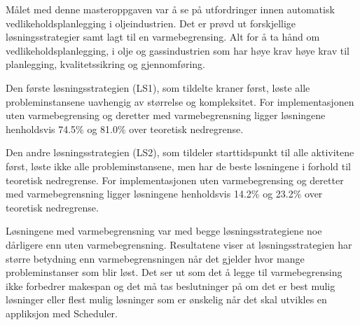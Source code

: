 Målet med denne masteroppgaven var å se på utfordringer innen automatisk vedlikeholdsplanlegging i oljeindustrien. Det er prøvd ut forskjellige løsningsstrategier samt lagt til en varmebegrensing. Alt for å ta hånd om vedlikeholdsplanlegging, i olje og gassindustrien som har høye krav høye krav til planlegging, kvalitetssikring og gjennomføring.

Den første løsningsstrategien (LS1), som tildelte kraner først, løste alle probleminstansene uavhengig av størrelse og kompleksitet. For implementasjonen uten varmebegrensing og deretter med varmebegrensning ligger løsningene henholdsvis 74.5\% og 81.0\% over teoretisk nedregrense. 

Den andre løsningsstrategien (LS2), som tildeler starttidspunkt til alle aktivitene først, løste ikke alle probleminstansene, men har de beste løsningene i forhold til teoretisk nedregrense. For implementasjonen uten varmebegrensing og deretter med varmebegrensning ligger løsningene henholdsvis 14.2\% og 23.2\% over teoretisk nedregrense.

Løsningene med varmebegrensning var med begge løsningsstrategiene noe dårligere enn uten varmebegrensning. Resultatene viser at løsningsstrategien har større betydning enn varmebegrensningen når det gjelder hvor mange probleminstanser som blir løst. Det ser ut som det å legge til varmebegrensing ikke forbedrer makespan og det må tas beslutninger på om det er best mulig løsninger eller flest mulig løsninger som er ønskelig når det skal utvikles en appliksjon med Scheduler.